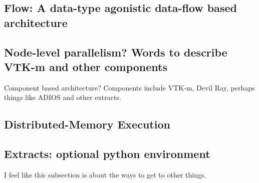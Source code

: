 \subsection{Flow: A data-type agonistic data-flow based architecture}
\cite{flow_reference}

\subsection{Node-level parallelism? Words to describe VTK-m and other components}

Component based architecture? Components include VTK-m, Devil Ray, perhaps things like ADIOS and other extracts.

\subsection{Distributed-Memory Execution}

\subsection{Extracts: optional python environment}
I feel like this subsection is about the ways to get to other things.

